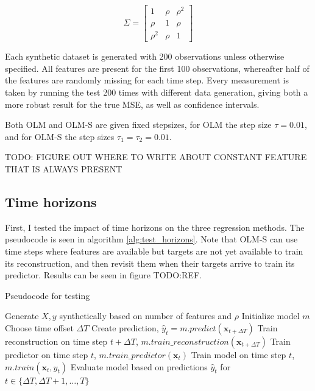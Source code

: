 \begin{equation}
  \Sigma = \begin{bmatrix} 1 & \rho & \rho^2 \\ \rho & 1 & \rho \\ \rho^2 & \rho & 1 \end{bmatrix}
\end{equation}

Each synthetic dataset is generated with 200 observations unless otherwise
specified. All features are present for the first 100 observations, whereafter
half of the features are randomly missing for each time step. Every measurement
is taken by running the test 200 times with different data generation, giving
both a more robust result for the true MSE, as well as confidence intervals.

Both OLM and OLM-S are given fixed stepsizes, for OLM the step size
$\tau=0.01$, and for OLM-S the step sizes $\tau_1=\tau_2=0.01$.

TODO: FIGURE OUT WHERE TO WRITE ABOUT CONSTANT FEATURE THAT IS ALWAYS PRESENT

\subsection{Time horizons}

First, I tested the impact of time horizons on the three regression methods.
The pseudocode is seen in algorithm \ref{alg:test_horizons}. Note that OLM-S
can use time steps where features are available but targets are not yet
available to train its reconstruction, and then revisit them when their targets
arrive to train its predictor. Results can be seen in figure TODO:REF.

\begin{algorithm}
  \caption{Pseudocode for testing}\label{alg:test_horizons}
  \begin{algorithmic}
    \State Generate $X,y$ synthetically based on number of features and $\rho$
    \State Initialize model $m$
    \State Choose time offset $\Delta T$
    \State Create prediction, $\hat y_t = m.predict(\mathbf{x}_{t+\Delta T})$
    \EndIf
    \State Train reconstruction on time step $t+\Delta T$, $m.train\_reconstruction(\mathbf{x}_{t+\Delta T})$
    \State Train predictor on time step $t$, $m.train\_predictor(\mathbf{x}_{t})$
    \Else
    \State Train model on time step $t$, $m.train(\mathbf{x}_{t} ,y_{t})$
    \EndIf
    \EndFor
    \State Evaluate model based on predictions $\hat y_t$ for $t \in \{\Delta T, \Delta T+1, \dots, T\}$
  \end{algorithmic} %
\end{algorithm}

